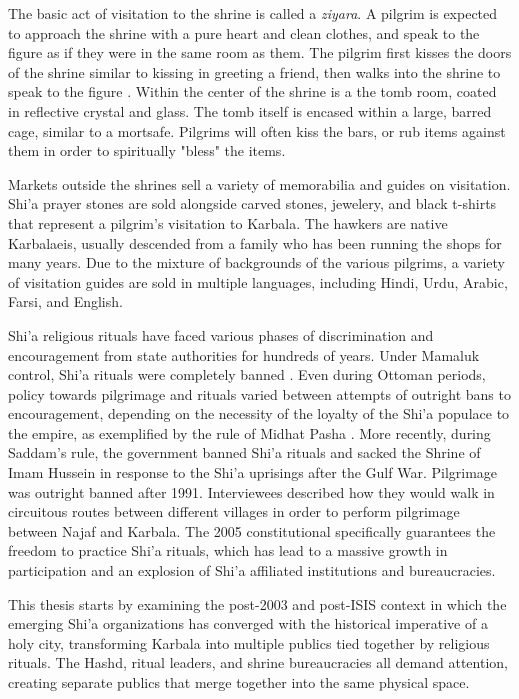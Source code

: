 The basic act of visitation to the shrine is called a \emph{ziyara}. A pilgrim is expected to approach the shrine with a pure heart and clean clothes, and speak to the figure as if they were in the same room as them. The pilgrim first kisses the doors of the shrine similar to kissing in greeting a friend, then walks into the shrine to speak to the figure \cite{qisa_publications_illustrated_2018}. Within the center of the shrine is a the tomb room, coated in reflective crystal and glass. The tomb itself is encased within a large, barred cage, similar to a mortsafe. Pilgrims will often kiss the bars, or rub items against them in order to spiritually "bless" the items. 

Markets outside the shrines sell a variety of memorabilia and guides on visitation. Shi'a prayer stones are sold alongside carved stones, jewelery, and black t-shirts that represent a pilgrim's visitation to Karbala. The hawkers are native Karbalaeis, usually descended from a family who has been running the shops for many years. Due to the mixture of backgrounds of the various pilgrims, a variety of visitation guides are sold in multiple languages, including Hindi, Urdu, Arabic, Farsi, and English. 

Shi'a religious rituals have faced various phases of discrimination and encouragement from state authorities for hundreds of years. Under Mamaluk control, Shi'a rituals were completely banned \cite{yitzhak_nakash_attempt_1993}. Even during Ottoman periods, policy towards pilgrimage and rituals varied between attempts of outright bans to encouragement, depending on the necessity of the loyalty of the Shi'a populace to the empire, as exemplified by the rule of Midhat Pasha \cite{aghaie_martyrs_2004}. More recently, during Saddam's rule, the government banned Shi'a rituals and sacked the Shrine of Imam Hussein in response to the Shi'a uprisings after the Gulf War. Pilgrimage was outright banned after 1991. Interviewees described how they would walk in circuitous routes between different villages in order to perform pilgrimage between Najaf and Karbala. The 2005 constitutional specifically guarantees the freedom to practice Shi'a rituals, which has lead to a massive growth in participation and an explosion of Shi'a affiliated institutions and bureaucracies. 

This thesis starts by examining the post-2003 and post-ISIS context in which the emerging Shi'a organizations has converged with the historical imperative of a holy city, transforming Karbala into multiple publics tied together by religious rituals. The Hashd, ritual leaders, and shrine bureaucracies all demand attention, creating separate publics that merge together into the same physical space. 